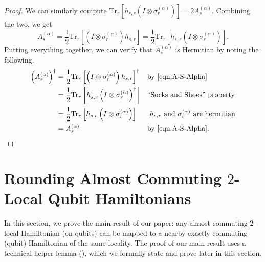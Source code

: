 \documentclass[11pt]{article}
\theoremstyle{plain}
\begin{document}
\begin{proof}
\noindent We can similarly compute $\mathrm{Tr}_{r}\left[ h_{s,r} \left(I \otimes \sigma_r^{(\alpha)} \right)\right] = 2 A_s^{(\alpha)}$. Combining the two, we get
\begin{equation}\label{eqn:A-S-Alpha}
    A_s^{(\alpha)} = \frac{1}{2} \mathrm{Tr}_{r}\left[\left(I \otimes \sigma_r^{(\alpha)} \right) h_{s,r} \right] = \frac{1}{2} \mathrm{Tr}_{r}\left[ h_{s,r} \left(I \otimes \sigma_r^{(\alpha)} \right)\right].
\end{equation}
Putting everything together, we can verify that $A_s^{(\alpha)}$ is Hermitian by noting the following.
\begin{align}
\left(A_s^{(\alpha)}\right)^\dagger &= \frac{1}{2} \mathrm{Tr}_{r}\left[\left(I \otimes \sigma_r^{(\alpha)} \right) h_{s,r} \right]^\dagger && \text{by \Cref{eqn:A-S-Alpha}}\\
    &= \frac{1}{2} \mathrm{Tr}_{r}\left[ h_{s,r}^\dagger \left(I \otimes \sigma_r^{(\alpha)} \right)^\dagger \right] && \text{``Socks and Shoes'' property} \\
    &= \frac{1}{2} \mathrm{Tr}_{r}\left[ h_{s,r} \left(I \otimes \sigma_r^{(\alpha)} \right) \right] && \text{ $h_{s,r}$ and $\sigma_r^{(\alpha)}$ are hermitian}\\
    &= A_s^{(\alpha)} && \text{by \Cref{eqn:A-S-Alpha}.}
\end{align}
\end{proof}

\fi
\section{Rounding Almost Commuting $2$-Local Qubit Hamiltonians}
In this section, we prove the main result of our paper: any almost commuting $2$-local Hamiltonian (on qubits) can be mapped to a nearby exactly commuting (qubit) Hamiltonian of the same locality. The proof of our main result uses a technical helper lemma (), which we formally state and prove later in this section.
\end{document}
